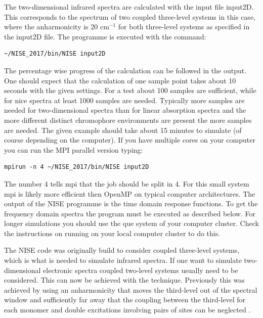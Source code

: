 The two-dimensional infrared spectra are calculated with the input file input2D. This
corresponds to the spectrum of two coupled three-level systems in this case, where
the anharmonicity is 20 cm$^{-1}$ for both three-level systems as specified in the
input2D file. The programme is executed with the command:
\begin{lstlisting}[style=mystyle]
~/NISE_2017/bin/NISE input2D
\end{lstlisting}
The percentage wise progress of the calculation can be followed in the output. One
should expect that the calculation of one sample point takes about 10 seconds with the
given settings. For a test about 100 samples are sufficient, while for nice spectra at 
least 1000 samples are needed. Typically more samples are needed for two-dimensional
spectra than for linear absorption spectra and the more different distinct chromophore
environments are present the more samples are needed. The given example should take
about 15 minutes to simulate (of course depending on the computer).
If you have multiple cores on your computer you can run the MPI parallel version
typing:
\begin{lstlisting}[style=mystyle]
mpirun -n 4 ~/NISE_2017/bin/NISE input2D
\end{lstlisting}
The number 4 tells mpi that the job should be split in 4. For this small system mpi
is likely more efficient then OpenMP on typical computer architectures. The output
of the NISE programme is the time domain response functions. To get the frequency
domain spectra the  program must be executed as described below. For longer
simulations you should use the que system of your computer cluster. Check the
instructions on running on your local computer cluster to do this.

The NISE code was originally build to consider coupled three-level systems, which is
what is needed to simulate infrared spectra. If one want to simulate two-dimensional
electronic spectra coupled two-level systems usually need to be considered. This can
now be achieved with the  technique. Previously this was achieved by
using an anharmonicity that moves the third-level out of the spectral window and
sufficiently far away that the coupling between the third-level for each monomer and
double excitations involving pairs of sites can be neglected
\cite{Olbrich.2011.JPCB.115.8609,Liang.2012.JCTC.8.1706}. 

